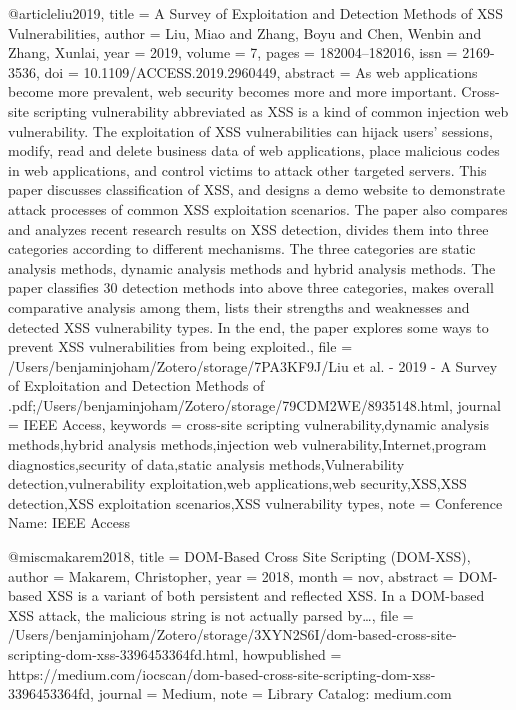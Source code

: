 @article{liu2019,
  title = {A {{Survey}} of {{Exploitation}} and {{Detection Methods}} of {{XSS Vulnerabilities}}},
  author = {Liu, Miao and Zhang, Boyu and Chen, Wenbin and Zhang, Xunlai},
  year = {2019},
  volume = {7},
  pages = {182004--182016},
  issn = {2169-3536},
  doi = {10.1109/ACCESS.2019.2960449},
  abstract = {As web applications become more prevalent, web security becomes more and more important. Cross-site scripting vulnerability abbreviated as XSS is a kind of common injection web vulnerability. The exploitation of XSS vulnerabilities can hijack users' sessions, modify, read and delete business data of web applications, place malicious codes in web applications, and control victims to attack other targeted servers. This paper discusses classification of XSS, and designs a demo website to demonstrate attack processes of common XSS exploitation scenarios. The paper also compares and analyzes recent research results on XSS detection, divides them into three categories according to different mechanisms. The three categories are static analysis methods, dynamic analysis methods and hybrid analysis methods. The paper classifies 30 detection methods into above three categories, makes overall comparative analysis among them, lists their strengths and weaknesses and detected XSS vulnerability types. In the end, the paper explores some ways to prevent XSS vulnerabilities from being exploited.},
  file = {/Users/benjaminjoham/Zotero/storage/7PA3KF9J/Liu et al. - 2019 - A Survey of Exploitation and Detection Methods of .pdf;/Users/benjaminjoham/Zotero/storage/79CDM2WE/8935148.html},
  journal = {IEEE Access},
  keywords = {cross-site scripting vulnerability,dynamic analysis methods,hybrid analysis methods,injection web vulnerability,Internet,program diagnostics,security of data,static analysis methods,Vulnerability detection,vulnerability exploitation,web applications,web security,XSS,XSS detection,XSS exploitation scenarios,XSS vulnerability types},
  note = {Conference Name: IEEE Access}
}

@misc{makarem2018,
  title = {{{DOM}}-{{Based Cross Site Scripting}} ({{DOM}}-{{XSS}})},
  author = {Makarem, Christopher},
  year = {2018},
  month = nov,
  abstract = {DOM-based XSS is a variant of both persistent and reflected XSS. In a DOM-based XSS attack, the malicious string is not actually parsed by\ldots{}},
  file = {/Users/benjaminjoham/Zotero/storage/3XYN2S6I/dom-based-cross-site-scripting-dom-xss-3396453364fd.html},
  howpublished = {https://medium.com/iocscan/dom-based-cross-site-scripting-dom-xss-3396453364fd},
  journal = {Medium},
  note = {Library Catalog: medium.com}
}


